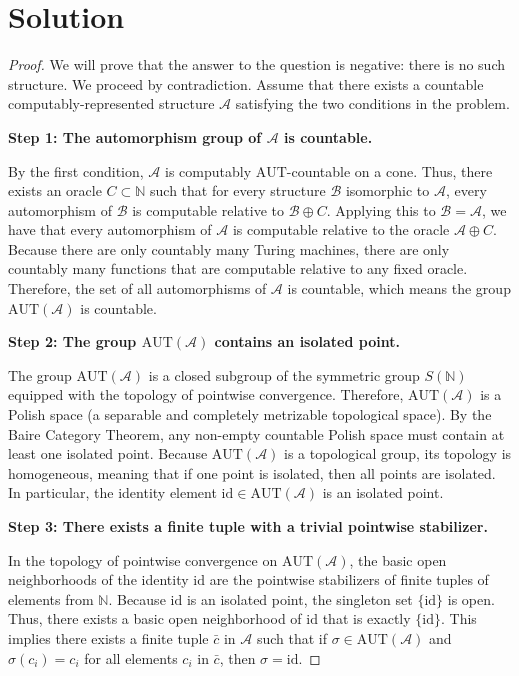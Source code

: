 \documentclass[12pt]{article}
\newcommand{\AUT}{\mathrm{AUT}}
\begin{document}
\section*{Solution}

\begin{proof}
We will prove that the answer to the question is negative: there is no such structure. We proceed by contradiction. Assume that there exists a countable computably-represented structure $\mathcal{A}$ satisfying the two conditions in the problem.

\textbf{Step 1: The automorphism group of $\mathcal{A}$ is countable.}

By the first condition, $\mathcal{A}$ is computably $\AUT$-countable on a cone. Thus, there exists an oracle $C \subset \mathbb{N}$ such that for every structure $\mathcal{B}$ isomorphic to $\mathcal{A}$, every automorphism of $\mathcal{B}$ is computable relative to $\mathcal{B} \oplus C$. 
Applying this to $\mathcal{B} = \mathcal{A}$, we have that every automorphism of $\mathcal{A}$ is computable relative to the oracle $\mathcal{A} \oplus C$. Because there are only countably many Turing machines, there are only countably many functions that are computable relative to any fixed oracle. Therefore, the set of all automorphisms of $\mathcal{A}$ is countable, which means the group $\AUT(\mathcal{A})$ is countable.

\textbf{Step 2: The group $\AUT(\mathcal{A})$ contains an isolated point.}

The group $\AUT(\mathcal{A})$ is a closed subgroup of the symmetric group $S(\mathbb{N})$ equipped with the topology of pointwise convergence. Therefore, $\AUT(\mathcal{A})$ is a Polish space (a separable and completely metrizable topological space). 
By the Baire Category Theorem, any non-empty countable Polish space must contain at least one isolated point. Because $\AUT(\mathcal{A})$ is a topological group, its topology is homogeneous, meaning that if one point is isolated, then all points are isolated. In particular, the identity element $\mathrm{id} \in \AUT(\mathcal{A})$ is an isolated point.

\textbf{Step 3: There exists a finite tuple with a trivial pointwise stabilizer.}

In the topology of pointwise convergence on $\AUT(\mathcal{A})$, the basic open neighborhoods of the identity $\mathrm{id}$ are the pointwise stabilizers of finite tuples of elements from $\mathbb{N}$. 
Because $\mathrm{id}$ is an isolated point, the singleton set $\{\mathrm{id}\}$ is open. Thus, there exists a basic open neighborhood of $\mathrm{id}$ that is exactly $\{\mathrm{id}\}$. This implies there exists a finite tuple $\bar{c}$ in $\mathcal{A}$ such that if $\sigma \in \AUT(\mathcal{A})$ and $\sigma(c_i) = c_i$ for all elements $c_i$ in $\bar{c}$, then $\sigma = \mathrm{id}$.


\end{proof}
\end{document}
